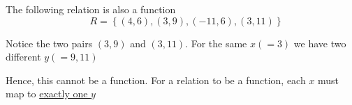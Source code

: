 \documentclass[14pt,fleqn]{extarticle}
\begin{document}
 
\begin{snippet}
    
    \incorrect
    
    The following relation is also a function 
    \[ \quad R = \left\lbrace (4,6),(3,9),(-11,6), (3,11) \right\rbrace\]
    
    \reason
    
    Notice the two pairs $(3,9)$ and $(3,11)$. For the same $x (=3)$ we have two different $y (=9,11)$ \newline 
    
    Hence, this cannot be a function. For a relation to be a function, each $x$ must map to \underline{exactly one $y$}\newline 
    
\end{snippet} 
\end{document}

